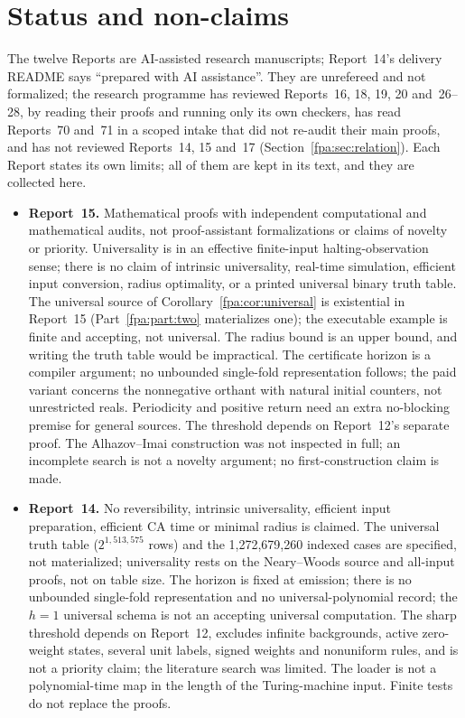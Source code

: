 \documentclass[11pt,a4paper]{article}
\numberwithin{equation}{section}
\begin{document}
\section{Status and non-claims}\label{fpa:sec:nonclaims}
The twelve Reports are AI-assisted research manuscripts; Report~14's delivery README says ``prepared with AI assistance''. They are unrefereed and not formalized; the research programme has reviewed Reports~16, 18, 19, 20 and~26--28, by reading their proofs and running only its own checkers, has read Reports~70 and~71 in a scoped intake that did not re-audit their main proofs, and has not reviewed Reports~14, 15 and~17 (Section~\ref{fpa:sec:relation}). Each Report states its own limits; all of them are kept in its text, and they are collected here.
\begin{itemize}
\item \textbf{Report~15.} Mathematical proofs with independent computational and mathematical audits, not proof-assistant formalizations or claims of novelty or priority. Universality is in an effective finite-input halting-observation sense; there is no claim of intrinsic universality, real-time simulation, efficient input conversion, radius optimality, or a printed universal binary truth table. The universal source of Corollary~\ref{fpa:cor:universal} is existential in Report~15 (Part~\ref{fpa:part:two} materializes one); the executable example is finite and accepting, not universal. The radius bound is an upper bound, and writing the truth table would be impractical. The certificate horizon is a compiler argument; no unbounded single-fold representation follows; the paid variant concerns the nonnegative orthant with natural initial counters, not unrestricted reals. Periodicity and positive return need an extra no-blocking premise for general sources. The threshold depends on Report~12's separate proof. The Alhazov--Imai construction was not inspected in full; an incomplete search is not a novelty argument; no first-construction claim is made.
\item \textbf{Report~14.} No reversibility, intrinsic universality, efficient input preparation, efficient CA time or minimal radius is claimed. The universal truth table ($2^{1,513,575}$ rows) and the 1,272,679,260 indexed cases are specified, not materialized; universality rests on the Neary--Woods source and all-input proofs, not on table size. The horizon is fixed at emission; there is no unbounded single-fold representation and no universal-polynomial record; the $h=1$ universal schema is not an accepting universal computation. The sharp threshold depends on Report~12, excludes infinite backgrounds, active zero-weight states, several unit labels, signed weights and nonuniform rules, and is not a priority claim; the literature search was limited. The loader is not a polynomial-time map in the length of the Turing-machine input. Finite tests do not replace the proofs.

\end{itemize}
\end{document}
